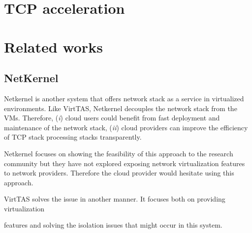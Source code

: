 \section{TCP acceleration}



\section{Related works}
\subsection{NetKernel}
Netkernel is another system that offers network stack as a service in virtualized 
environments. Like VirtTAS, Netkernel decouples the network stack from the VMs. Therefore, 
(\emph{i}) cloud users could benefit from fast deployment and maintenance of the network 
stack, (\emph{ii}) cloud providers can improve the efficiency of TCP stack processing stacks 
transparently. 

Netkernel focuses on showing the feasibility of this approach to the research community but 
they have not explored exposing network virtualization features to network providers. 
Therefore the cloud provider would hesitate using this approach. %

VirtTAS solves the issue in another manner. It focuses both on providing virtualization 

features and solving the isolation issues that might occur in this system. %